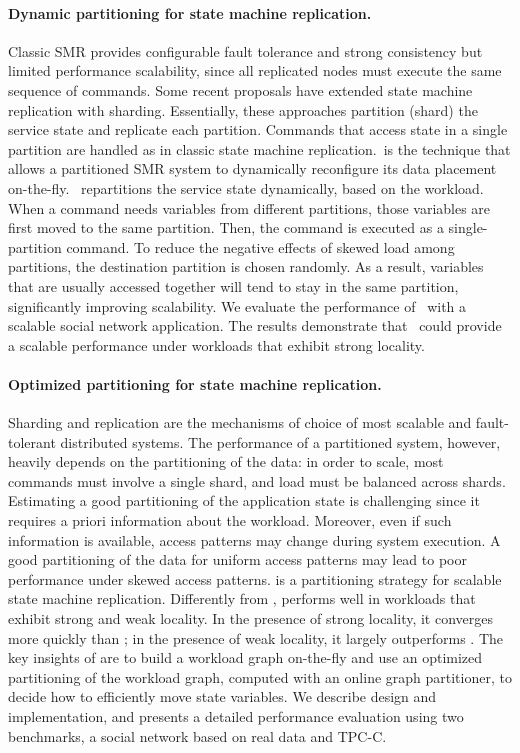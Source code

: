 \paragraph{Dynamic partitioning for state machine replication.} 
Classic SMR provides configurable fault tolerance and strong consistency but
limited performance scalability, since all replicated nodes must execute the same
sequence of commands. Some recent proposals have extended state machine
replication with sharding. Essentially, these approaches partition (shard) the
service state and replicate each partition. Commands that access state in a
single partition are handled as in classic state machine replication.\dssmr\ is
the technique that allows a partitioned SMR system to dynamically reconfigure
its data placement on-the-fly. \dssmr\ repartitions the service state
dynamically, based on the workload. When a command needs variables from
different partitions, those variables are first moved to the same partition.
Then, the command is executed as a single-partition command. To reduce the
negative effects of skewed load among partitions, the destination partition is chosen
randomly. As a result, variables that are usually accessed together will tend to
stay in the same partition, significantly improving scalability. We evaluate the
performance of \dssmr\ with a scalable social network application. The results
demonstrate that \dssmr\ could provide a scalable performance under workloads
that exhibit strong locality.

\paragraph{Optimized partitioning for state machine replication.}
Sharding and replication are the mechanisms of choice of most scalable and
fault-tolerant distributed systems. The performance of a partitioned system,
however, heavily depends on the partitioning of the data: in order to scale,
most commands must involve a single shard, and load must be balanced across
shards. Estimating a good partitioning of the application state is challenging
since it requires a priori information about the workload. Moreover, even if
such information is available, access patterns may change during system
execution. A good partitioning of the data for uniform access patterns may lead
to poor performance under skewed access patterns. \dynastar is a partitioning
strategy for scalable state machine replication. Differently from \dssmr{},
\dynastar performs well in workloads that exhibit strong and weak locality. In
the presence of strong locality, it converges more quickly than \dssmr{}; in the
presence of weak locality, it largely outperforms \dssmr{}. The key insights of
\dynastar are to build a workload graph on-the-fly and use an optimized
partitioning of the workload graph, computed with an online graph partitioner,
to decide how to efficiently move state variables. We describe \dynastar design
and implementation, and presents a detailed performance evaluation using two
benchmarks, a social network based on real data and TPC-C.

